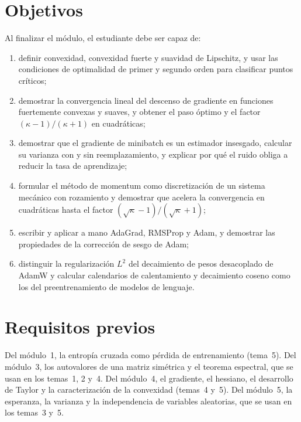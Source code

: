 \documentclass[11pt,a4paper,twoside,openany]{book}
\begin{document}
\section*{Objetivos}
Al finalizar el módulo, el estudiante debe ser capaz de:
\begin{enumerate}[label=\arabic*.]
  \item definir convexidad, convexidad fuerte y suavidad de Lipschitz, y usar las condiciones de optimalidad de primer y segundo orden para clasificar puntos críticos;
  \item demostrar la convergencia lineal del descenso de gradiente en funciones fuertemente convexas y suaves, y obtener el paso óptimo y el factor $(\kappa-1)/(\kappa+1)$ en cuadráticas;
  \item demostrar que el gradiente de minibatch es un estimador insesgado, calcular su varianza con y sin reemplazamiento, y explicar por qué el ruido obliga a reducir la tasa de aprendizaje;
  \item formular el método de momentum como discretización de un sistema mecánico con rozamiento y demostrar que acelera la convergencia en cuadráticas hasta el factor $(\sqrt\kappa-1)/(\sqrt\kappa+1)$;
  \item escribir y aplicar a mano AdaGrad, RMSProp y Adam, y demostrar las propiedades de la corrección de sesgo de Adam;
  \item distinguir la regularización $L^{2}$ del decaimiento de pesos desacoplado de AdamW y calcular calendarios de calentamiento y decaimiento coseno como los del preentrenamiento de modelos de lenguaje.
\end{enumerate}

\section*{Requisitos previos}
Del módulo~1, la entropía cruzada como pérdida de entrenamiento (tema~5). Del módulo~3, los autovalores de una matriz simétrica y el teorema espectral, que se usan en los temas~1, 2 y~4. Del módulo~4, el gradiente, el hessiano, el desarrollo de Taylor y la caracterización de la convexidad (temas~4 y~5). Del módulo~5, la esperanza, la varianza y la independencia de variables aleatorias, que se usan en los temas~3 y~5.
\end{document}
